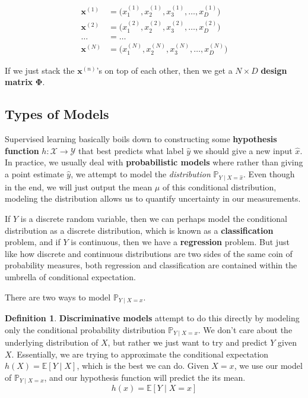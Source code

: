 \documentclass{article}
\theoremstyle{definition}
\newtheorem{definition}{Definition}[section]
\begin{document}
  \begin{align*} 
    \mathbf{x}^{(1)} & = \big(x^{(1)}_1, x^{(1)}_2, x^{(1)}_3, \ldots, x^{(1)}_D \big) \\
    \mathbf{x}^{(2)} & = \big(x^{(2)}_1, x^{(2)}_2, x^{(2)}_3, \ldots, x^{(2)}_D \big) \\
    \ldots & = \ldots \\
    \mathbf{x}^{(N)} & = \big(x^{(N)}_1, x^{(N)}_2, x^{(N)}_3, \ldots, x^{(N)}_D \big) 
  \end{align*}

  If we just stack the $\mathbf{x}^{(n)}$'s on top of each other, then we get a $N \times D$ \textbf{design matrix} $\boldsymbol{\Phi}$. 

  \subsection{Types of Models}

    Supervised learning basically boils down to constructing some \textbf{hypothesis function} $h: \mathcal{X} \rightarrow \mathcal{Y}$ that best predicts what label $\hat{y}$ we should give a new input $\hat{x}$. In practice, we usually deal with \textbf{probabilistic models} where rather than giving a point estimate $\hat{y}$, we attempt to model the \textit{distribution} $\mathbb{P}_{Y \mid X = \hat{x}}$. Even though in the end, we will just output the mean $\mu$ of this conditional distribution, modeling the distribution allows us to quantify uncertainty in our measurements. 

    If $Y$ is a discrete random variable, then we can perhaps model the conditional distribution as a discrete distribution, which is known as a \textbf{classification} problem, and if $Y$ is continuous, then we have a \textbf{regression} problem. But just like how discrete and continuous distributions are two sides of the same coin of probability measures, both regression and classification are contained within the umbrella of conditional expectation. 

    There are two ways to model $\mathbb{P}_{Y \mid X = x}$. 

    \begin{definition}
      \textbf{Discriminative models} attempt to do this directly by  modeling only the conditional probability distribution $\mathbb{P}_{Y \mid X = x}$. We don't care about the underlying distribution of $X$, but rather we just want to try and predict $Y$ given $X$. Essentially, we are trying to approximate the conditional expectation $h(X) = \mathbb{E}[Y \mid X]$, which is the best we can do. Given $X = x$, we use our model of $\mathbb{P}_{Y \mid X = x}$, and our hypothesis function will predict the its mean. 
        \[h(x) = \mathbb{E}[Y \mid X = x]\]
    \end{definition}
\end{document}
